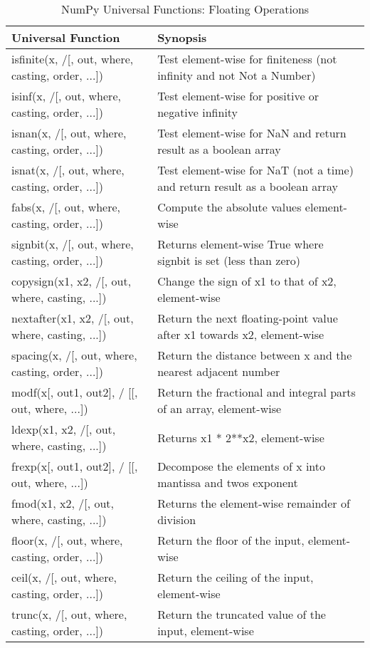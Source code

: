 \documentclass[a4paper,11pt]{book}
\numberwithin{figure}{chapter}
\numberwithin{table}{chapter}
\begin{document}
\begin{appendices}
\begin{table}
\caption{NumPy Universal Functions: Floating Operations}
\centering
\begin{tabular}{lp{8.5cm}}
\toprule \toprule 
Universal Function & Synopsis \\
\midrule
isfinite(x, /[, out, where, casting, order, ...])
& Test element-wise for finiteness (not infinity and not Not a Number)\\
isinf(x, /[, out, where, casting, order, ...])
&  Test element-wise for positive or negative infinity\\
isnan(x, /[, out, where, casting, order, ...])
& Test element-wise for NaN and return result as a boolean array\\
isnat(x, /[, out, where, casting, order, ...])
& Test element-wise for NaT (not a time) and return result as a boolean array\\
fabs(x, /[, out, where, casting, order, ...])
& Compute the absolute values element-wise\\
signbit(x, /[, out, where, casting, order, ...])
& Returns element-wise True where signbit is set (less than zero)\\
copysign(x1, x2, /[, out, where, casting, ...])
& Change the sign of x1 to that of x2, element-wise\\
nextafter(x1, x2, /[, out, where, casting, ...])
& Return the next floating-point value after x1 towards x2, element-wise\\
spacing(x, /[, out, where, casting, order, ...])
& Return the distance between x and the nearest adjacent number\\
modf(x[, out1, out2], / [[, out, where, ...])
& Return the fractional and integral parts of an array, element-wise\\
ldexp(x1, x2, /[, out, where, casting, ...])
& Returns x1 * 2**x2, element-wise\\
frexp(x[, out1, out2], / [[, out, where, ...])
& Decompose the elements of x into mantissa and twos exponent\\
fmod(x1, x2, /[, out, where, casting, ...])
& Returns the element-wise remainder of division\\
floor(x, /[, out, where, casting, order, ...])
& Return the floor of the input, element-wise\\
ceil(x, /[, out, where, casting, order, ...])
& Return the ceiling of the input, element-wise\\
trunc(x, /[, out, where, casting, order, ...])
& Return the truncated value of the input, element-wise\\
\bottomrule
\end{tabular}
\end{table}
\clearpage


\end{appendices}
\end{document}
